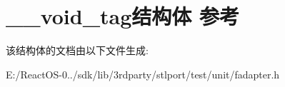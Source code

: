 \hypertarget{struct____void__tag}{}\section{\+\_\+\+\_\+void\+\_\+tag结构体 参考}
\label{struct____void__tag}


该结构体的文档由以下文件生成\+:\begin{DoxyCompactItemize}
\item 
E\+:/\+React\+O\+S-\/0../sdk/lib/3rdparty/stlport/test/unit/fadapter.\+h\end{DoxyCompactItemize}

